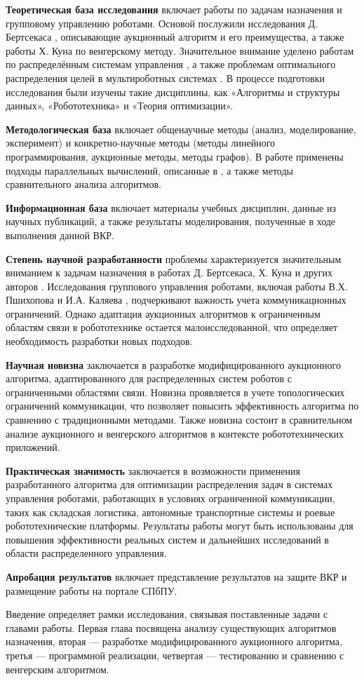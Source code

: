 \textbf{Теоретическая база исследования} включает работы по задачам назначения и групповому управлению роботами. Основой послужили исследования Д. Бертсекаса \cite{bertsekas1990}, описывающие аукционный алгоритм и его преимущества, а также работы Х. Куна \cite{kuhn1955} по венгерскому методу. Значительное внимание уделено работам по распределённым системам управления \cite{pshikhopov2015, kalyaev2009}, а также проблемам оптимального распределения целей в мультироботных системах \cite{gerkey2003}. В процессе подготовки исследования были изучены такие дисциплины, как «Алгоритмы и структуры данных», «Робототехника» и «Теория оптимизации».

\textbf{Методологическая база} включает общенаучные методы (анализ, моделирование, эксперимент) и конкретно-научные методы (методы линейного программирования, аукционные методы, методы графов). В работе применены подходы параллельных вычислений, описанные в \cite{bertsekas1990}, а также методы сравнительного анализа алгоритмов.

\textbf{Информационная база} включает материалы учебных дисциплин, данные из научных публикаций, а также результаты моделирования, полученные в ходе выполнения данной ВКР.

\textbf{Степень научной разработанности} проблемы характеризуется значительным вниманием к задачам назначения в работах Д. Бертсекаса, Х. Куна и других авторов \cite{bertsekas1990, kuhn1955, bertsekas1989, gerkey2003}. Исследования группового управления роботами, включая работы В.Х. Пшихопова \cite{pshikhopov2015} и И.А. Каляева \cite{kalyaev2009}, подчеркивают важность учета коммуникационных ограничений. Однако адаптация аукционных алгоритмов к ограниченным областям связи в робототехнике остается малоисследованной, что определяет необходимость разработки новых подходов.

\textbf{Научная новизна} заключается в разработке модифицированного аукционного алгоритма, адаптированного для распределенных систем роботов с ограниченными областями связи. Новизна проявляется в учете топологических ограничений коммуникации, что позволяет повысить эффективность алгоритма по сравнению с традиционными методами. Также новизна состоит в сравнительном анализе аукционного и венгерского алгоритмов в контексте робототехнических приложений.

\textbf{Практическая значимость} заключается в возможности применения разработанного алгоритма для оптимизации распределения задач в системах управления роботами, работающих в условиях ограниченной коммуникации, таких как складская логистика, автономные транспортные системы и роевые робототехнические платформы. Результаты работы могут быть использованы для повышения эффективности реальных систем и дальнейших исследований в области распределенного управления.

\textbf{Апробация результатов} включает представление результатов на защите ВКР и размещение работы на портале СПбПУ.

Введение определяет рамки исследования, связывая поставленные задачи с главами работы. Первая глава посвящена анализу существующих алгоритмов назначения, вторая — разработке модифицированного аукционного алгоритма, третья — программной реализации, четвертая — тестированию и сравнению с венгерским алгоритмом.
